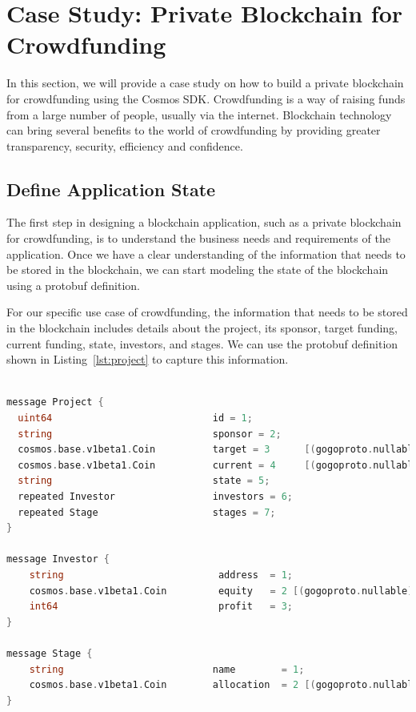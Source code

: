 \section{Case Study: Private Blockchain for Crowdfunding}

In this section, we will provide a case study on how to build a private blockchain for crowdfunding using the Cosmos SDK. Crowdfunding is a way of raising funds from a large number of people, usually via the internet. Blockchain technology can bring several benefits to the world of crowdfunding by providing greater transparency, security, efficiency and confidence.


\subsection{Define Application State}

The first step in designing a blockchain application, such as a private blockchain for crowdfunding, is to understand the business needs and requirements of the application. Once we have a clear understanding of the information that needs to be stored in the blockchain, we can start modeling the state of the blockchain using a protobuf definition.

For our specific use case of crowdfunding, the information that needs to be stored in the blockchain includes details about the project, its sponsor, target funding, current funding, state, investors, and stages. We can use the protobuf definition shown in Listing~\ref{lst:project} to capture this information.

\begin{lstlisting}[language=go, caption=Project definition,label={lst:project}]

message Project {
  uint64                            id = 1;
  string                            sponsor = 2;
  cosmos.base.v1beta1.Coin          target = 3      [(gogoproto.nullable) = false];
  cosmos.base.v1beta1.Coin          current = 4     [(gogoproto.nullable) = false];
  string                            state = 5;
  repeated Investor                 investors = 6;
  repeated Stage                    stages = 7;
}

message Investor {
    string                           address  = 1;
    cosmos.base.v1beta1.Coin         equity   = 2 [(gogoproto.nullable) = false];
    int64                            profit   = 3;
}

message Stage {
    string                          name        = 1;
    cosmos.base.v1beta1.Coin        allocation  = 2 [(gogoproto.nullable) = false];
}
\end{lstlisting}

